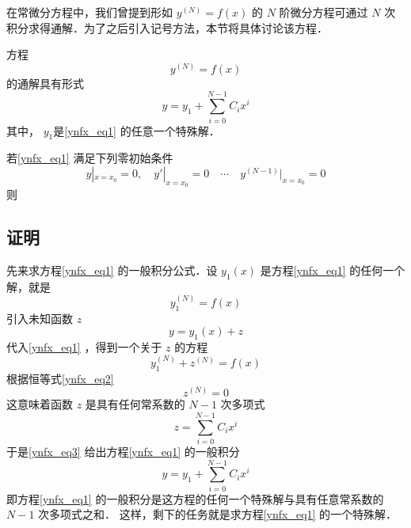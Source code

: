 在常微分方程中，我们曾提到形如 $y^{(N)}=f(x)$ 的 $N$ 阶微分方程可通过 $N$ 次积分求得通解．为了之后引入记号方法，本节将具体讨论该方程．

方程
\begin{equation}\label{ynfx_eq1}
y^{(N)}=f(x)
\end{equation}
的通解具有形式
\begin{equation}
y=y_1+\sum_{i=0}^{N-1}C_ix^i
\end{equation}
其中， $y_1$是\autoref{ynfx_eq1} 的任意一个特殊解．

若\autoref{ynfx_eq1} 满足下列零初始条件
\begin{equation}
y|_{x=x_0}=0,\quad y'|_{x=x_0}=0\quad\cdots \quad y^{(N-1)}|_{x=x_0}=0
\end{equation}
则

\subsection{证明}
先来求方程\autoref{ynfx_eq1} 的一般积分公式．设 $y_1(x)$ 是方程\autoref{ynfx_eq1} 的任何一个解，就是
\begin{equation}\label{ynfx_eq2}
y_1^{(N)}=f(x)
\end{equation}
引入未知函数 $z$
\begin{equation}\label{ynfx_eq3}
y=y_1(x)+z
\end{equation}
代入\autoref{ynfx_eq1} ，得到一个关于 $z$ 的方程
\begin{equation}
y_1^{(N)}+z^{(N)}=f(x)
\end{equation}
根据恒等式\autoref{ynfx_eq2} 
\begin{equation}
z^{(N)}=0
\end{equation}
这意味着函数 $z$ 是具有任何常系数的 $N-1$ 次多项式
\begin{equation}
z=\sum_{i=0}^{N-1}C_ix^i
\end{equation}
于是\autoref{ynfx_eq3} 给出方程\autoref{ynfx_eq1} 的一般积分
\begin{equation}
y=y_1+\sum_{i=0}^{N-1}C_ix^i
\end{equation}
即方程\autoref{ynfx_eq1} 的一般积分是这方程的任何一个特殊解与具有任意常系数的 $N-1$ 次多项式之和．
这样，剩下的任务就是求方程\autoref{ynfx_eq1} 的一个特殊解．